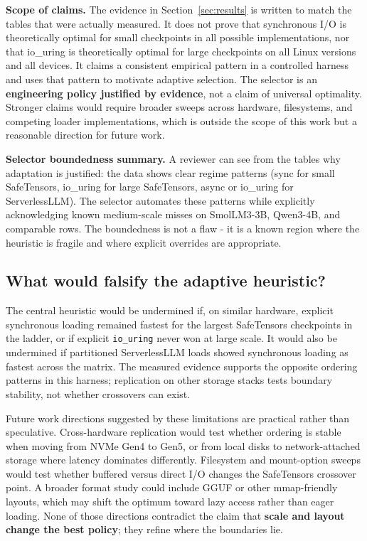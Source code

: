 \textbf{Scope of claims.} The evidence in Section~\ref{sec:results} is written to match the tables that were actually measured. It does not prove that synchronous I/O is theoretically optimal for small checkpoints in all possible implementations, nor that io\_uring is theoretically optimal for large checkpoints on all Linux versions and all devices. It claims a consistent empirical pattern in a controlled harness and uses that pattern to motivate adaptive selection. The selector is an \textbf{engineering policy justified by evidence}, not a claim of universal optimality. Stronger claims would require broader sweeps across hardware, filesystems, and competing loader implementations, which is outside the scope of this work but a reasonable direction for future work.

\textbf{Selector boundedness summary.} A reviewer can see from the tables why adaptation is justified: the data shows clear regime patterns (sync for small SafeTensors, io\_uring for large SafeTensors, async or io\_uring for ServerlessLLM). The selector automates these patterns while explicitly acknowledging known medium-scale misses on SmolLM3-3B, Qwen3-4B, and comparable rows. The boundedness is not a flaw - it is a known region where the heuristic is fragile and where explicit overrides are appropriate.

\subsection{What would falsify the adaptive heuristic?}

The central heuristic would be undermined if, on similar hardware, explicit synchronous loading remained fastest for the largest SafeTensors checkpoints in the ladder, or if explicit \texttt{io\_uring} never won at large scale. It would also be undermined if partitioned ServerlessLLM loads showed synchronous loading as fastest across the matrix. The measured evidence supports the opposite ordering patterns in this harness; replication on other storage stacks tests boundary stability, not whether crossovers can exist.

Future work directions suggested by these limitations are practical rather than speculative. Cross-hardware replication would test whether ordering is stable when moving from NVMe Gen4 to Gen5, or from local disks to network-attached storage where latency dominates differently. Filesystem and mount-option sweeps would test whether buffered versus direct I/O changes the SafeTensors crossover point. A broader format study could include GGUF or other mmap-friendly layouts, which may shift the optimum toward lazy access rather than eager loading. None of those directions contradict the claim that \textbf{scale and layout change the best policy}; they refine where the boundaries lie.
